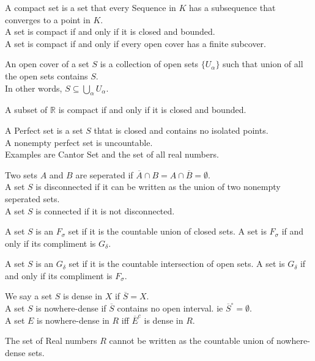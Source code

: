 \documentclass[answers,12pt,addpoints]{exam}
\begin{document}
\begin{definition}
    A compact set is a set that every Sequence in $K$ has a subsequence that converges to a point in $K$.\\
    A set is compact if and only if it is closed and bounded.\\
    A set is compact if and only if every open cover has a finite subcover.
\end{definition}
\begin{definition}
    An open cover of a set $S$ is a collection of open sets $\{U_\alpha\}$ such that union of all the open sets contains $S$.\\
    In other words, $S \subseteq \bigcup_{\alpha} U_\alpha$.
\end{definition}
\begin{theorem}
    A subset of $\mathbb{R}$ is compact if and only if it is closed and bounded.
\end{theorem}
\begin{definition}
    A Perfect set is a set $S$ thtat is closed and contains no isolated points.\\
    A nonempty perfect set is uncountable.\\
    Examples are Cantor Set and the set of all real numbers.
\end{definition}
\begin{definition}
    Two sets $A$ and $B$ are seperated if $\overline{A} \cap B = A \cap \overline{B} = \emptyset$.\\
    A set $S$ is disconnected if it can be written as the union of two nonempty seperated sets.\\
    A set $S$ is connected if it is not disconnected.
\end{definition}
\begin{definition}
    A set $S$ is an $F_\sigma$ set if it is the countable union of closed sets.
    A set is $F_\sigma$ if and only if its compliment is $G_\delta$.
\end{definition}
\begin{definition}
    A set $S$ is an $G_\delta$ set if it is the countable intersection of open sets.
    A set is $G_\delta$ if and only if its compliment is $F_\sigma$.
\end{definition}
\begin{definition}
    We say a set $S$ is dense in $X$ if $\overline{S} = X$.\\
    A set $S$ is nowhere-dense if $\overline{S}$ contains no open interval. ie $\overline{S}^\circ = \emptyset$.\\
    A set $E$ is nowhere-dense in $R$ iff $\overline{E}^c$ is dense in $R$. 
\end{definition}
\begin{definition}
    The set of Real numbers $R$ cannot be written as the countable union of nowhere-dense sets.
\end{definition}
\end{document}
